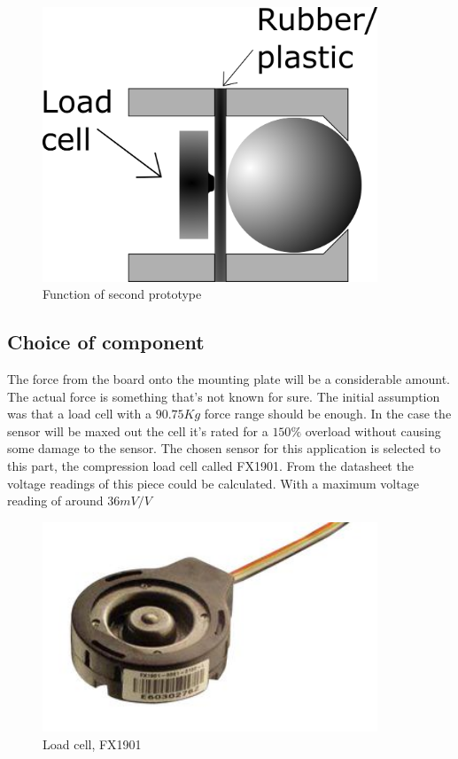 \begin{figure}[H]%
\begin{center}
	\includegraphics[width = 10cm]{Figures/Press_sens_func_2.png}
	\caption{Function of second prototype}
	\label{Press_sens_prot_2}
\end{center}
\end{figure}

\subsection{Choice of component}

The force from the board onto the mounting plate will be a considerable amount. The actual force is something that’s not known for sure. The initial assumption was that a load cell with a $90.75Kg$ force range should be enough. In the case the sensor will be maxed out the cell it's rated for a $150\%$ overload without causing some damage to the sensor.
The chosen sensor for this application is selected to this part, the compression load cell called FX1901. 
From the datasheet the voltage readings of this piece could be calculated. With a maximum voltage reading of around $36mV/V$

 \begin{figure}[H]%
\begin{center}
	\includegraphics[width = 10cm]{Figures/Load_cell.png}
	\caption{Load cell, FX1901}
	\label{Load_cell}
\end{center}
\end{figure}



